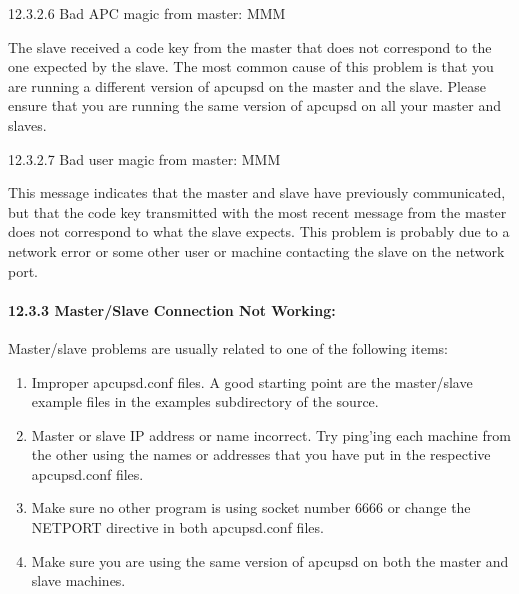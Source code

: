 {{{{{{{{{\label{Bad-APC-magic-from-master_003b-MMM}

{\small12.3.2.6 Bad APC magic from master: MMM}

The slave received a code key from the master that does not correspond to the
one expected by the slave. The most common cause of this problem is that you
are running a different version of apcupsd on the master and the slave. Please
ensure that you are running the same version of apcupsd on all your master and
slaves. 

\label{Bad-user-magic-from-master_003b-MMM}

{\small12.3.2.7 Bad user magic from master: MMM}

This message indicates that the master and slave have previously communicated,
but that the code key transmitted with the most recent message from the master
does not correspond to what the slave expects. This problem is probably due to
a network error or some other user or machine contacting the slave on the
network port. 

\label{Master_002fSlave-Connection-Not-Working}

\paragraph*{12.3.3 Master/Slave Connection Not Working:}

Master/slave problems are usually related to one of the following items:  

\begin{enumerate}
\item Improper apcupsd.conf files. A good starting point are the master/slave
example files in the examples subdirectory of the source.  
\item Master or slave IP address or name incorrect. Try ping'ing each machine
from the other using the names or addresses that you have put in the
respective apcupsd.conf files.  
\item Make sure no other program is using socket number 6666 or change the
NETPORT directive in both apcupsd.conf files.  
\item Make sure you are using the same version of apcupsd on both the master
and slave machines.  
\end{enumerate}

}}}}}}}}}
